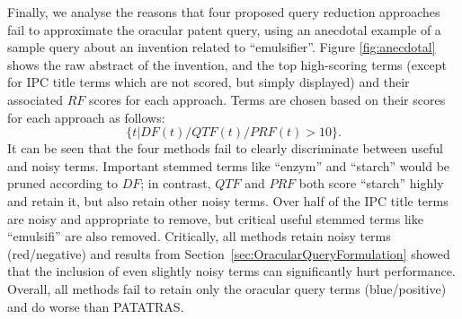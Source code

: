 Finally, we analyse the reasons that four proposed query reduction approaches fail to approximate the oracular patent query, using an anecdotal example of a sample query about an invention related to ``emulsifier''. 
Figure \ref{fig:anecdotal} shows the raw abstract of the invention, and the top high-scoring terms (except for IPC title terms which are not scored, but simply displayed) and their associated $\mathit{RF}$ scores for each approach. 
Terms are chosen based on their scores for each approach as follows: 
\begin{displaymath}\{t| DF(t)/QTF(t)/PRF(t)>10\}.\end{displaymath}
It can be seen that the four methods fail to clearly discriminate between useful and noisy terms.  Important stemmed terms like ``enzym'' and ``starch'' would be pruned according to $\mathit{DF}$; in contrast, $\mathit{QTF}$ and $\mathit{PRF}$ both score ``starch'' highly and retain it, but also retain other noisy terms.  Over half of the IPC title terms are noisy and appropriate to remove, but critical useful stemmed terms like ``emulsifi'' are also removed.
  Critically, all methods retain noisy terms (red/negative) and results from Section~\ref{sec:OracularQueryFormulation} showed that the inclusion of even slightly noisy terms can significantly hurt performance.  Overall, all methods fail to retain only the oracular query terms (blue/positive) and do worse than PATATRAS.
